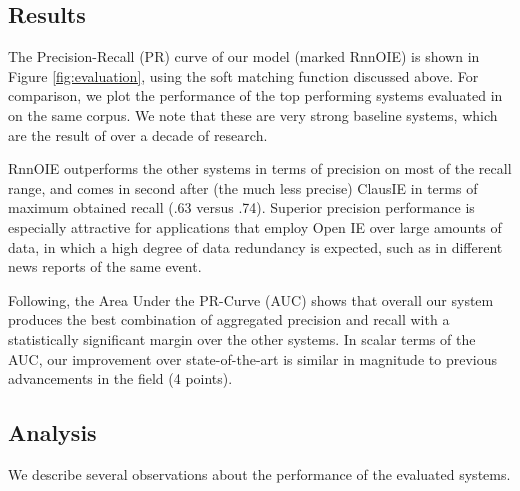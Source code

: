 \subsection{Results}



The Precision-Recall (PR) curve of our model (marked RnnOIE) is shown in Figure \ref{fig:evaluation},
using the soft matching function discussed above.
For comparison, we plot the performance of the top performing systems evaluated in \cite{Stanovsky2016EMNLP} on the same corpus. We note that these are very strong baseline systems, which are the result of over a decade of research.

RnnOIE outperforms the other systems in terms of precision on most of the recall range, and comes in second after (the much less precise) ClausIE in terms of maximum obtained recall (.63 versus .74).
Superior precision performance is especially attractive for
applications that employ Open IE over large amounts of data, in which a high degree of data redundancy is expected, such as in different news reports of the same event.

Following, the Area Under the PR-Curve (AUC) shows that overall our system
produces the best combination of aggregated precision and recall with a statistically significant margin over
the other systems. In scalar terms of the AUC, our improvement over state-of-the-art is similar in magnitude to previous
advancements in the field (4 points).






\subsection{Analysis}
We describe several observations about the performance of the evaluated systems.

